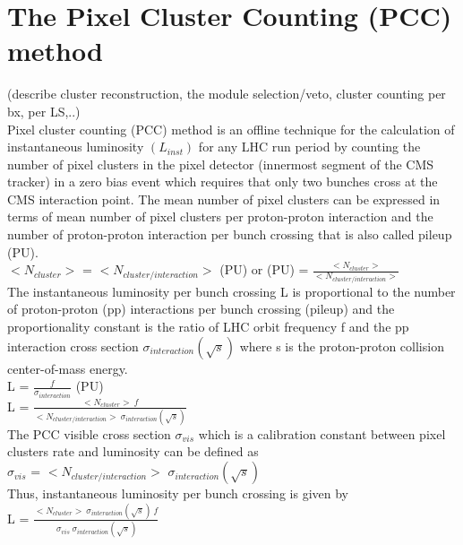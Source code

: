 \section{The Pixel Cluster Counting (PCC) method}
\label{sec:pcc}
(describe cluster reconstruction, the module selection/veto, cluster counting per bx, per LS,..) \\

Pixel cluster counting (PCC)  method is an offline technique for the calculation of instantaneous luminosity $(L_{inst})$ for any LHC run period by counting the number of pixel clusters in the pixel detector (innermost segment of the CMS tracker) in a zero bias event which requires that only two bunches cross at the CMS interaction point. The mean number of pixel clusters can be expressed in terms of mean number of pixel clusters per proton-proton interaction and the number of proton-proton interaction per bunch crossing that is also called pileup (PU). \\

$<N_{cluster}>$ = $<N_{cluster/interaction}>$ (PU)  or (PU) = $\frac{<N_{cluster}>}{<N_{cluster/interaction}>}$ \\

The instantaneous luminosity per bunch crossing L is proportional to the number of proton-proton (pp) interactions per bunch crossing (pileup) and the proportionality constant is the ratio of  LHC orbit frequency f and the pp interaction cross section $\sigma_{interaction}(\sqrt{s})$ where s is the proton-proton collision center-of-mass energy. \\

L = $\frac{f}{\sigma_{interaction}}$ (PU)  \\

L = $\frac{<N_{cluster}> \: f }{<N_{cluster/interaction}> \: \sigma_{interaction}(\sqrt{s})}$ \\

The PCC visible cross section $\sigma_{vis}$ which is a calibration constant between pixel clusters rate and luminosity can be defined as \\

$\sigma_{vis}$ = $<N_{cluster/interaction}>$  $\sigma_{interaction}(\sqrt{s})$ \\

\newpage Thus, instantaneous luminosity per bunch crossing is given by \\

L = $\frac{<N_{cluster}> \: \sigma_{interaction}(\sqrt{s}) \: f }{ \:\sigma_{vis} \: \sigma_{interaction}(\sqrt{s})}$ \\

